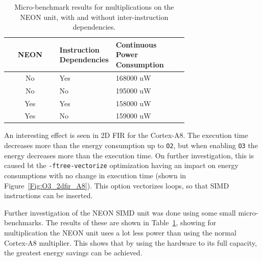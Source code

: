 \documentclass[twocolumn]{article}
\let\oldcaption\caption
\renewcommand{\caption}[1]{\oldcaption{\textup{#1}}}
\begin{document}
\begin{table}
	\centering
	\begin{tabular}{c p{0.3\linewidth} p{0.4\linewidth}}
		\bfseries NEON & \bfseries Instruction Dependencies & \bfseries Continuous Power Consumption \\
		\hline
		No & \centering Yes & {\hspace{0.85cm} 168000 uW } \\
		No & \centering No & {\hspace{0.85cm} 195000 uW } \\
		Yes & \centering Yes & {\hspace{0.85cm} 158000 uW } \\
		Yes & \centering No & {\hspace{0.85cm} 159000 uW } \\
	\end{tabular}
	\caption{Micro-benchmark results for multiplications on the NEON unit, with and without inter-instruction dependencies.}
	\label{Table:SIMD}
\end{table}

An interesting effect is seen in 2D FIR for the Cortex-A8. The execution time decreases more than the energy consumption up to \texttt{O2}, but when enabling \texttt{O3} the energy decreases more than the execution time. On further investigation, this is caused bt the \texttt{-ftree-vectorize} optimization having an impact on energy consumptions with no change in execution time (shown in Figure~\ref{Fig:O3_2dfir_A8}). This option vectorizes loops, so that SIMD instructions can be inserted.

Further investigation of the NEON SIMD unit was done using some small micro-benchmarks. The results of these are shown in Table~\ref{Table:SIMD}, showing for multiplication the NEON unit uses a lot less power than using the normal Cortex-A8 multiplier. This shows that by using the hardware to its full capacity, the greatest energy savings can be achieved.

\end{document}
